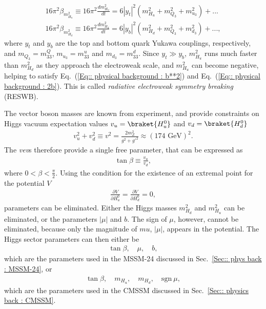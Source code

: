 \documentclass[twoside,english]{uiofysmaster}
\begin{document}
{\begin{align}
16 \pi^2\beta_{m_{H_u}^2} \equiv 16 \pi^2 \frac{d m_{H_u}^2}{dt} = 6 |y_t|^2(m_{H_u}^2 + m_{Q_3}^2 + m_{u_3}^2) +...\\
16 \pi^2\beta_{m_{H_d}^2} \equiv 16 \pi^2 \frac{d m_{H_d}^2}{dt} = 6 |y_b|^2(m_{H_d}^2 + m_{Q_3}^2 + m_{d_3}^2) +...,
\end{align} 
where $y_t$ and $y_b$ are the top and bottom quark Yukawa couplings, respectively, and $m_{Q_3} = m_{33}^Q$, $m_{u_3}= m_{33}^u$ and $m_{d_3} = m_{33}^d$. Since $y_t \gg y_b$, $m_{H_u}^2$ runs much faster than $m_{H_d}^2$ as they approach the electroweak scale, and $m_{H_u}^2$ can become negative, helping to satisfy Eq.~(\ref{Eq:: physical background : b**2}) and Eq.~(\ref{Eq:: physical background : 2b}). This is called \textit{radiative electroweak symmetry breaking} (RESWB).

The vector boson masses are known from experiment, and provide constraints on Higgs vacuum expectation values $v_u = \braket{H_u^0}$ and $v_d = \braket{H_d^0}$
\begin{align}
v_u^2 + v_d^2 \equiv v^2 = \frac{2m_Z^2}{g^2 + {g'}^2} \approx (174 \text{ GeV})^2.
\end{align} 
The \textit{vev}s therefore provide a single free parameter, that can be expressed as
\begin{align}
\tan \beta \equiv \frac{v_u}{v_d},
\end{align}
where $0< \beta < \frac{\pi}{2}$. Using the condition for the existence of an extremal point for the potential $V$
\begin{align}
\frac{\partial V}{\partial H_u^0} = \frac{\partial V}{\partial H_d^0} = 0,
\end{align}
parameters can be eliminated. Either the Higgs masses $m_{H_d}^2$ and $m_{H_u}^2$ can be eliminated, or the parameters $|\mu|$ and $b$. The sign of $\mu$, however, cannot be eliminated, because only the magnitude of $mu$, $|\mu|$, appears in the potential. The Higgs sector parameters can then either be
\begin{align}
\tan \beta, \quad \mu, \quad b,
\end{align}
which are the parameters used in the MSSM-24 discussed in Sec.~\ref{Sec:: phys back : MSSM-24}, or 
\begin{align}
\tan \beta, \quad m_{H_u}, \quad m_{H_d}, \quad \mathrm{sgn}~\mu,
\end{align}
which are the parameters used in the CMSSM discussed in Sec.~\ref{Sec:: physics back : CMSSM}.

}
\end{document}
